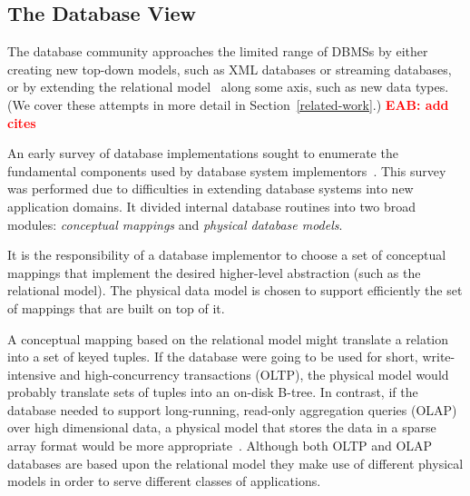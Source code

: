 \documentclass[letterpaper,twocolumn,10pt]{article}
\newcommand{\eab}[1]{\textcolor{red}{\bf EAB: #1}}
\begin{document}
\subsection{The Database View}

The database community approaches the limited range of DBMSs by either
creating new top-down models, such as XML databases or streaming
databases, or by extending the relational model~\cite{codd} along some axis, such
as new data types.  (We cover these attempts in more detail in
Section~\ref{related-work}.) \eab{add cites}


An early survey of database implementations sought to enumerate the
fundamental components used by database system implementors~\cite{batoryConceptual,batoryPhysical}.  This
survey was performed due to difficulties in extending database systems
into new application domains.  It divided internal database
routines into two broad modules: {\em conceptual mappings} and {\em physical
database models}.


It is the responsibility of a database implementor to choose a set of
conceptual mappings that implement the desired higher-level
abstraction (such as the relational model).  The physical data model
is chosen to support efficiently the set of mappings that are built on
top of it.

A conceptual mapping based on the relational model might translate a
relation into a set of keyed tuples.  If the database were going to be
used for short, write-intensive and high-concurrency transactions
(OLTP), the physical model would probably translate sets of tuples
into an on-disk B-tree.  In contrast, if the database needed to
support long-running, read-only aggregation queries (OLAP) over high
dimensional data, a physical model that stores the data in a sparse
array format would be more appropriate~\cite{molap}.  Although both
OLTP and OLAP databases are based upon the relational model they make
use of different physical models in order to serve different classes
of applications.
\end{document}
